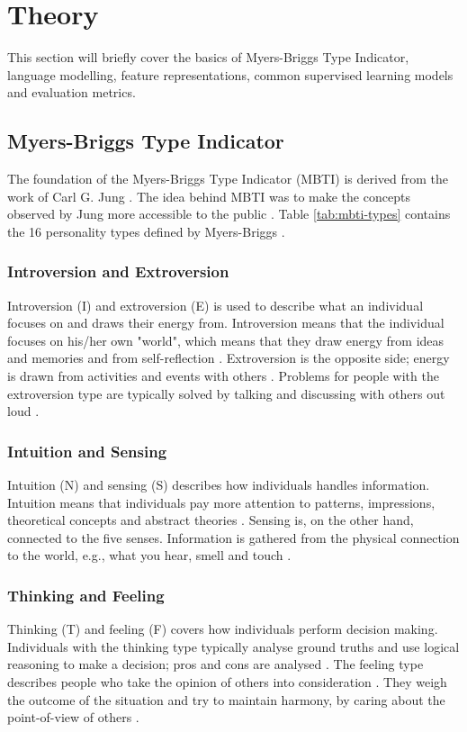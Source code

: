 \section{Theory}

This section will briefly cover the basics of Myers-Briggs Type Indicator, language modelling, feature representations, common supervised learning models and evaluation metrics.

\subsection{Myers-Briggs Type Indicator}
The foundation of the Myers-Briggs Type Indicator (MBTI) is derived from the work of Carl G. Jung \cite{jung2014psychological}.
The idea behind MBTI was to make the concepts observed by Jung more accessible to the public \cite{mbti}.
Table \ref{tab:mbti-types} contains the 16 personality types defined by Myers-Briggs \cite{mbti}.

\subsubsection{Introversion and Extroversion}
Introversion (I) and extroversion (E) is used to describe what an individual focuses on and draws their energy from.
Introversion means that the individual focuses on his/her own "world", which means that they draw energy from ideas and memories and from self-reflection \cite{mbti-IE}.
Extroversion is the opposite side; energy is drawn from activities and events with others \cite{mbti-IE}.
Problems for people with the extroversion type are typically solved by talking and discussing with others out loud \cite{mbti-IE}.

\subsubsection{Intuition and Sensing}
Intuition (N) and sensing (S) describes how individuals handles information.
Intuition means that individuals pay more attention to patterns, impressions, theoretical concepts and abstract theories \cite{mbti-NS}.
Sensing is, on the other hand, connected to the five senses.
Information is gathered from the physical connection to the world, e.g., what you hear, smell and touch \cite{mbti-NS}.

\subsubsection{Thinking and Feeling}
Thinking (T) and feeling (F) covers how individuals perform decision making.
Individuals with the thinking type typically analyse ground truths and use logical reasoning to make a decision; pros and cons are analysed \cite{mbti-TF}.
The feeling type describes people who take the opinion of others into consideration \cite{mbti-TF}.
They weigh the outcome of the situation and try to maintain harmony, by caring about the point-of-view of others \cite{mbti-TF}.

